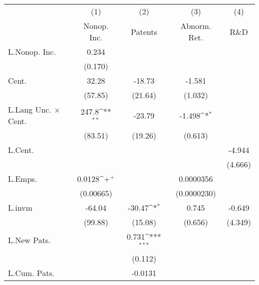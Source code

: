 {
\def\sym#1{\ifmmode^{#1}\else\(^{#1}\)\fi}
\begin{tabular}{l*{4}{c}}
\hline\hline
                    &\multicolumn{1}{c}{(1)}&\multicolumn{1}{c}{(2)}&\multicolumn{1}{c}{(3)}&\multicolumn{1}{c}{(4)}\\
                    &\multicolumn{1}{c}{Nonop. Inc.}&\multicolumn{1}{c}{Patents}&\multicolumn{1}{c}{Abnorm. Ret.}&\multicolumn{1}{c}{R\&D}\\
\hline
L.Nonop. Inc.       &       0.234         &                     &                     &                     \\
                    &     (0.170)         &                     &                     &                     \\
Cent.               &       32.28         &      -18.73         &      -1.581         &                     \\
                    &     (57.85)         &     (21.64)         &     (1.032)         &                     \\
L.Lang Unc. $\times$ Cent.&       247.8\sym{**} &      -23.79         &      -1.498\sym{*}  &                     \\
                    &     (83.51)         &     (19.26)         &     (0.613)         &                     \\
L.Cent.             &                     &                     &                     &      -4.944         \\
                    &                     &                     &                     &     (4.666)         \\
L.Emps.             &      0.0128\sym{+}  &                     &   0.0000356         &                     \\
                    &   (0.00665)         &                     & (0.0000230)         &                     \\
L.invm              &      -64.04         &      -30.47\sym{*}  &       0.745         &      -0.649         \\
                    &     (99.88)         &     (15.08)         &     (0.656)         &     (4.349)         \\
L.New Pats.         &                     &       0.731\sym{***}&                     &                     \\
                    &                     &     (0.112)         &                     &                     \\
L.Cum. Pats.        &                     &     -0.0131         &                     &                     \\

\end{tabular}}
